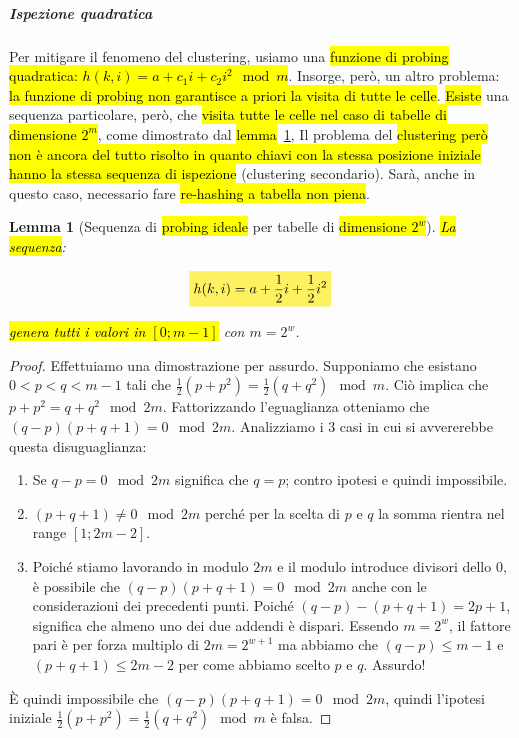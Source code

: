 \documentclass[a4paper,11pt,twoside]{article}
\theoremstyle{plain}
\newtheorem{lem}{Lemma}[section]
\theoremstyle{definition}
\theoremstyle{remark}
\newcommand{\mhl}[1]{\colorbox{hlcolor}{$\displaystyle #1$}}
\begin{document}
\subparagraph{Ispezione quadratica} Per mitigare il fenomeno del clustering,
usiamo una \hl{funzione di probing quadratica: $h(k,i) = a + c_1 i + c_2 i^2
\mod{m}$}. Insorge, però, un altro problema: \hl{la funzione di probing non
garantisce a priori la visita di tutte le celle}. \hl{Esiste} una sequenza
particolare, però, che \hl{visita tutte le celle nel caso di tabelle di
dimensione $2^m$}, come dimostrato dal \hl{lemma}~\ref{thm:tabelle-2-m}, Il
problema del \hl{clustering però non è ancora del tutto risolto in quanto chiavi
con la stessa posizione iniziale hanno la stessa sequenza di ispezione}
(clustering secondario). Sarà, anche in questo caso, necessario fare
\hl{re-hashing a tabella non piena}.

\begin{lem}[Sequenza di \hl{probing ideale} per tabelle di \hl{dimensione $2^w$}]\label{thm:tabelle-2-m}
  \hl{La sequenza}:

  \begin{equation}
    \mhl{
      h(k,i) = a + \frac{1}{2} i + \frac{1}{2} i^2
    }
  \end{equation}

  \hl{genera tutti i valori in $[0; m-1]$} con $m = 2^w$.
\end{lem}
\begin{proof}
  Effettuiamo una dimostrazione per assurdo. Supponiamo che esistano $0 < p < q
  < m-1$ tali che $\frac{1}{2}(p + p^2) = \frac{1}{2}(q + q^2) \mod{m}$. Ciò
  implica che $p + p^2 = q + q^2 \mod{2m}$. Fattorizzando l'eguaglianza
  otteniamo che $(q-p)(p+q+1) = 0 \mod{2m}$. Analizziamo i 3 casi in cui si
  avvererebbe questa disuguaglianza:

  \begin{enumerate}
    \item Se $q - p = 0 \mod{2m}$ significa che $q = p$; contro ipotesi e quindi
      impossibile.
    \item $(p + q + 1) \neq 0 \mod{2m}$ perché per la scelta di $p$ e $q$ la
      somma rientra nel range $[1; 2m - 2]$.
    \item Poiché stiamo lavorando in modulo $2m$ e il modulo introduce divisori
      dello $0$, è possibile che $(q-p)(p+q+1) = 0 \mod{2m}$ anche con le
      considerazioni dei precedenti punti. Poiché $(q-p) - (p+q+1) = 2p + 1$,
      significa che almeno uno dei due addendi è dispari. Essendo $m = 2^w$, il
      fattore pari è per forza multiplo di $2m = 2^{w+1}$ ma abbiamo che $(q-p)
      \leq m-1$ e $(p+q+1) \leq 2m-2$ per come abbiamo scelto $p$ e $q$.
      Assurdo!
  \end{enumerate}

  È quindi impossibile che $(q-p)(p+q+1) = 0 \mod{2m}$, quindi l'ipotesi
  iniziale $\frac{1}{2}(p + p^2) = \frac{1}{2}(q + q^2) \mod{m}$ è falsa.
\end{proof}
\end{document}
